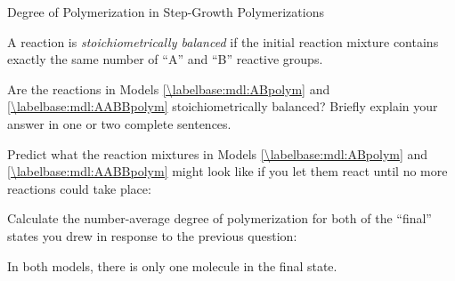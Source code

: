 \begin{activity}{Degree of Polymerization in Step-Growth Polymerizations}
\begin{ctqs}
\end{ctqs}
	
\begin{infobox}

A reaction is \emph{stoichiometrically balanced} if the initial reaction mixture contains exactly the same number of ``A'' and ``B'' reactive groups.

\end{infobox}
	
\begin{ctqs}
		\question Are the reactions in Models \ref{\labelbase:mdl:ABpolym} and \ref{\labelbase:mdl:AABBpolym} stoichiometrically balanced?  Briefly explain your answer in one or two complete sentences.
		
		\begin{solution}[1in]\end{solution}
		
		\question Predict what the reaction mixtures in Models \ref{\labelbase:mdl:ABpolym} and \ref{\labelbase:mdl:AABBpolym} might look like if you let them react until no more reactions could take place:
		
	\begin{solution}[2in]
	
	\end{solution}
		
		\question Calculate the number-average degree of polymerization for both of the ``final'' states you drew in response to the previous question:
		
		\begin{solution}[1in]
			In both models, there is only one molecule in the final state.
			

\end{solution}
\end{ctqs}
\end{activity}
